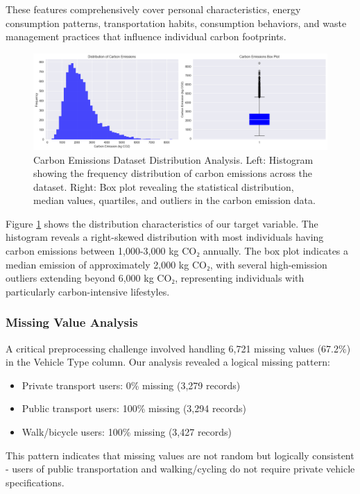 \documentclass[12pt,a4paper]{article}
\begin{document}
These features comprehensively cover personal characteristics, energy consumption patterns, transportation habits, consumption behaviors, and waste management practices that influence individual carbon footprints.

\begin{figure}[H]
\centering
\includegraphics[width=\textwidth]{dist.png}
\caption{Carbon Emissions Dataset Distribution Analysis. Left: Histogram showing the frequency distribution of carbon emissions across the dataset. Right: Box plot revealing the statistical distribution, median values, quartiles, and outliers in the carbon emission data.}
\label{fig:distribution}
\end{figure}

Figure \ref{fig:distribution} shows the distribution characteristics of our target variable. The histogram reveals a right-skewed distribution with most individuals having carbon emissions between 1,000-3,000 kg CO₂ annually. The box plot indicates a median emission of approximately 2,000 kg CO₂, with several high-emission outliers extending beyond 6,000 kg CO₂, representing individuals with particularly carbon-intensive lifestyles.

\subsubsection{Missing Value Analysis}

A critical preprocessing challenge involved handling 6,721 missing values (67.2\%) in the Vehicle Type column. Our analysis revealed a logical missing pattern:

\begin{itemize}
    \item Private transport users: 0\% missing (3,279 records)
    \item Public transport users: 100\% missing (3,294 records)  
    \item Walk/bicycle users: 100\% missing (3,427 records)
\end{itemize}

This pattern indicates that missing values are not random but logically consistent - users of public transportation and walking/cycling do not require private vehicle specifications.
\end{document}
